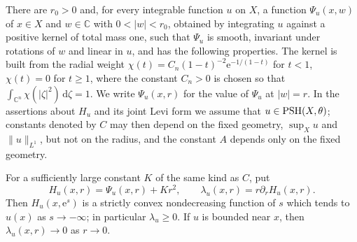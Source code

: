 \begin{lemma}\label{lem:chern-joint-smoothing}
There are $r_0>0$ and, for every integrable function $u$ on $X$, a function $\Psi_u(x,w)$ of $x\in X$ and $w\in\mathbb C$ with $0<|w|<r_0$, obtained by integrating $u$ against a positive kernel of total mass one, such that $\Psi_u$ is smooth, invariant under rotations of $w$ and linear in $u$, and has the following properties. The kernel is built from the radial weight $\chi(t)=C_n(1-t)^{-2}\mathrm e^{-1/(1-t)}$ for $t<1$, $\chi(t)=0$ for $t\geq1$, where the constant $C_n>0$ is chosen so that $\int_{\mathbb C^n}\chi(|\zeta|^2)\,\mathrm d\zeta=1$. We write $\Psi_u(x,r)$ for the value of $\Psi_u$ at $|w|=r$. In the assertions about $H_u$ and its joint Levi form we assume that $u\in\mathrm{PSH}(X,\theta)$; constants denoted by $C$ may then depend on the fixed geometry, $\sup_Xu$ and $\|u\|_{L^1}$, but not on the radius, and the constant $A$ depends only on the fixed geometry.

For a sufficiently large constant $K$ of the same kind as $C$, put
\[
 H_u(x,r)=\Psi_u(x,r)+Kr^2,\qquad
 \lambda_u(x,r)=r\partial_rH_u(x,r).
\]
Then $H_u(x,\mathrm e^s)$ is a strictly convex nondecreasing function of $s$ which tends to $u(x)$ as $s\to-\infty$; in particular $\lambda_u\geq0$. If $u$ is bounded near $x$, then $\lambda_u(x,r)\to0$ as $r\to0$.


\end{lemma}
